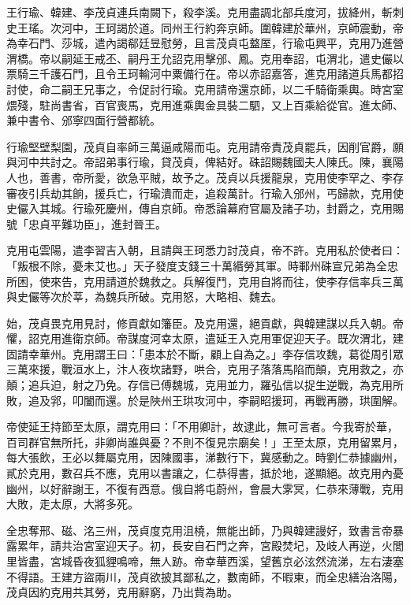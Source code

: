 \begin{pinyinscope}
 王行瑜、韓建、李茂貞連兵南闕下，殺李溪。克用盡調北部兵度河，拔絳州，斬刺史王瑤。次河中，王珂謁於道。同州王行約奔京師。圍韓建於華州，京師震動，帝為幸石門、莎城，遣內謁郗廷昱慰勞，且言茂貞屯盩厔，行瑜屯興平，克用乃進營渭橋。帝以嗣延王戒丕、嗣丹王允詔克用擊邠、鳳。克用奉詔，屯渭北，遣史儼以票騎三千護石門，且令王珂輸河中粟備行在。帝以赤詔嘉答，進克用諸道兵馬都招討使，命二嗣王兄事之，令促討行瑜。克用請帝還京師，以二千騎衛乘輿。時宮室煨殘，駐尚書省，百官喪馬，克用進乘輿金具裝二駟，又上百乘給從官。進太師、兼中書令、邠寧四面行營都統。



 行瑜堅壁梨園，茂貞自率師三萬逼咸陽而屯。克用請帝責茂貞罷兵，因削官爵，願與河中共討之。帝詔弟事行瑜，貸茂貞，俾結好。硃詔賜魏國夫人陳氏。陳，襄陽人也，善書，帝所愛，欲急平賊，故予之。茂貞以兵援龍泉，克用使李罕之、李存審夜引兵劫其餉，援兵亡，行瑜潰而走，追殺萬計。行瑜入邠州，丐歸款，克用使史儼入其城。行瑜死慶州，傳自京師。帝悉論幕府官屬及諸子功，封爵之，克用賜號「忠貞平難功臣」，進封晉王。



 克用屯雲陽，遣李習吉入朝，且請與王珂悉力討茂貞，帝不許。克用私於使者曰：「叛根不除，憂未艾也。」天子發度支錢三十萬緡勞其軍。時鄆州硃宣兄弟為全忠所困，使來告，克用請道於魏救之。兵解復鬥，克用自將而往，使李存信率兵三萬與史儼等次於莘，為魏兵所破。克用怒，大略相、魏去。



 始，茂貞畏克用見討，修貢獻如籓臣。及克用還，絕貢獻，與韓建謀以兵入朝。帝懼，詔克用進衛京師。帝謀度河幸太原，遣延王入克用軍促迎天子。既次渭北，建固請幸華州。克用謂王曰：「患本於不斷，顧上自為之。」李存信攻魏，葛從周引眾三萬來援，戰洹水上，汴人夜坎諸野，哄合，克用子落落馬陷而顛，克用救之，亦顛；追兵迫，射之乃免。存信已傅魏城，克用並力，羅弘信以捉生逆戰，為克用所敗，追及郛，叩闔而還。於是陜州王珙攻河中，李嗣昭援珂，再戰再勝，珙圍解。



 帝使延王持節至太原，謂克用曰：「不用卿計，故逮此，無可言者。今我寄於華，百司群官無所托，非卿尚誰與憂？不則不復見宗廟矣！」王至太原，克用留累月，每大張飲，王必以舞屬克用，因陳國事，涕數行下，冀感動之。時劉仁恭據幽州，貳於克用，數召兵不應，克用以書讓之，仁恭得書，抵於地，遂顯絕。故克用內憂幽州，以好辭謝王，不復有西意。俄自將屯蔚州，會晨大雺冥，仁恭來薄戰，克用大敗，走太原，大將多死。



 全忠奪邢、磁、洺三州，茂貞度克用沮橈，無能出師，乃與韓建謾好，致書言帝暴露累年，請共治宮室迎天子。初，長安自石門之奔，宮殿焚圮，及岐人再逆，火閭里皆盡，宮城昏夜狐貍鳴啼，無人跡。帝幸華西溪，望舊京必泫然流涕，左右淒塞不得語。王建方盜兩川，茂貞欲披其鄙私之，數南師，不暇東，而全忠繕治洛陽，茂貞因約克用共其勞，克用辭窮，乃出貲為助。




\end{pinyinscope}
